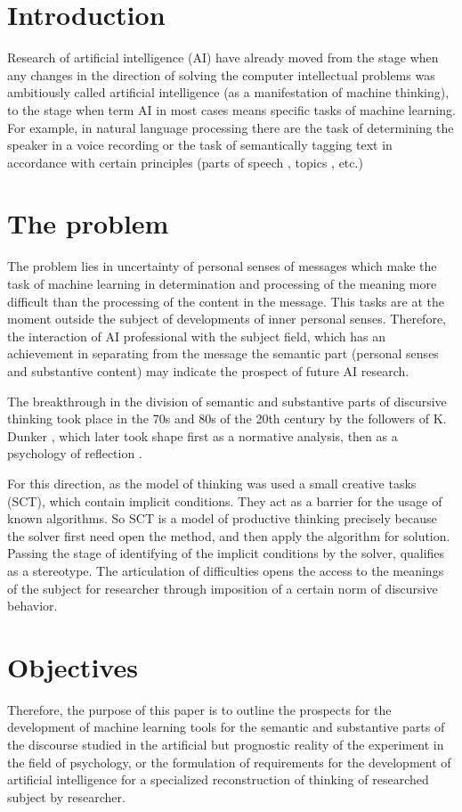 \documentclass[conference]{IEEEtran}
\begin{document}
	\section{Introduction}
	Research of artificial intelligence (AI) have already moved from the stage when any changes in the direction of solving the computer intellectual problems was ambitiously called artificial intelligence (as a manifestation of machine thinking), to the stage when term AI in most cases means specific tasks of machine learning. For example, in natural language processing there are the task of determining the speaker in a voice recording \cite{b25} or the task of semantically tagging \cite{b23} text in accordance with certain principles (parts of speech \cite{b24}, topics \cite{b26}, etc.)
	
	\section{The problem}
	
	The problem lies in uncertainty of personal senses of messages which make the task of machine learning in determination and processing of the meaning more difficult than the processing of the content in the message. This tasks are at the moment outside the subject of developments of inner personal senses. Therefore, the interaction of AI professional with the subject field, which has an achievement in separating from the message the semantic part (personal senses and substantive content) may indicate the prospect of future AI research.
	
	The breakthrough in the division of semantic and substantive parts of discursive thinking took place in the 70s and 80s of the 20th century by the followers of K. Dunker \cite{b4}, which later took shape first as a normative analysis, then as a psychology of reflection \cite{b20}.
	
	For this direction, as the model of thinking was used a small creative tasks (SCT), which contain implicit conditions. They act as a barrier for the usage of known algorithms. So SCT is a model of productive thinking precisely because the solver first need open the method, and then apply the algorithm for solution. Passing the stage of identifying of the implicit conditions by the solver, qualifies as a stereotype. The articulation of difficulties opens the access to the meanings of the subject for researcher through imposition of a certain norm of discursive behavior.
	
	\section{Objectives}
	Therefore, the purpose of this paper is to outline the prospects for the development of machine learning tools for the semantic and substantive parts of the discourse studied in the artificial but prognostic reality of the experiment in the field of psychology, or the formulation of requirements for the development of artificial intelligence for a specialized reconstruction of thinking of researched subject by researcher.
	
\end{document}
